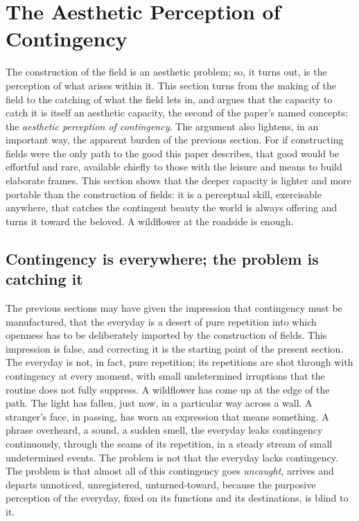 \section{The Aesthetic Perception of Contingency}
\label{p21:sec:aesthetic-perception}

\noindent
The construction of the field is an aesthetic problem; so, it turns out, is the perception of what arises within it. This section turns from the making of the field to the catching of what the field lets in, and argues that the capacity to catch it is itself an aesthetic capacity, the second of the paper's named concepts: the \emph{aesthetic perception of contingency}. The argument also lightens, in an important way, the apparent burden of the previous section. For if constructing fields were the only path to the good this paper describes, that good would be effortful and rare, available chiefly to those with the leisure and means to build elaborate frames. This section shows that the deeper capacity is lighter and more portable than the construction of fields: it is a perceptual skill, exercisable anywhere, that catches the contingent beauty the world is always offering and turns it toward the beloved. A wildflower at the roadside is enough.

\subsection{Contingency is everywhere; the problem is catching it}
\label{p21:sub:ap-everywhere}

The previous sections may have given the impression that contingency must be manufactured, that the everyday is a desert of pure repetition into which openness has to be deliberately imported by the construction of fields. This impression is false, and correcting it is the starting point of the present section. The everyday is not, in fact, pure repetition; its repetitions are shot through with contingency at every moment, with small undetermined irruptions that the routine does not fully suppress. A wildflower has come up at the edge of the path. The light has fallen, just now, in a particular way across a wall. A stranger's face, in passing, has worn an expression that means something. A phrase overheard, a sound, a sudden smell, the everyday leaks contingency continuously, through the seams of its repetition, in a steady stream of small undetermined events. The problem is not that the everyday lacks contingency. The problem is that almost all of this contingency goes \emph{uncaught}, arrives and departs unnoticed, unregistered, unturned-toward, because the purposive perception of the everyday, fixed on its functions and its destinations, is blind to it.

